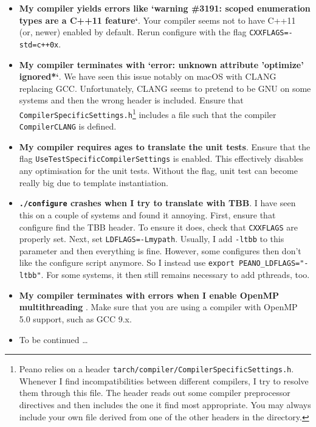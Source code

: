 \begin{itemize}
  \item \textbf{My compiler yields errors like `warning \#3191: scoped
  enumeration types are a C++11 feature`}. Your compiler seems not to have
  C++11 (or, newer) enabled by default. Rerun configure with the flag
  \texttt{CXXFLAGS=-std=c++0x}.
  \item \textbf{ My compiler terminates with `error: unknown
   attribute 'optimize' ignored*`}. We have seen this issue notably on macOS
   with CLANG replacing GCC. Unfortunately, CLANG seems to pretend to be GNU on
   some systems and then the wrong header is included. Ensure that
   \texttt{CompilerSpecificSettings.h}\footnote{Peano relies on a header \texttt{tarch/compiler/CompilerSpecificSettings.h}.
Whenever I find incompatibilities between different compilers, I try to resolve them through this file. 
The header reads out some compiler preprocessor directives and then includes the
one it find most appropriate. 
You may always include your own file derived from one of the other headers in
the directory.} includes a file such that the
   compiler
   \texttt{CompilerCLANG} is defined.
  \item \textbf{ My compiler requires ages to translate the unit tests}. Ensure
  that the flag \linebreak \texttt{UseTestSpecificCompilerSettings} is enabled.
  This effectively disables any optimisation for the unit tests. Without the
  flag, unit test can become really big due to template instantiation.
  \item \textbf{\texttt{./configure} crashes when I try to translate with TBB}.
  I have seen this on a couple of systems and found it annoying. 
  First, ensure that configure
  find the TBB header. To ensure it does, check that \texttt{CXXFLAGS} are properly
  set. Next, set \texttt{LDFLAGS=-Lmypath}. Usually, I add \texttt{-ltbb} to 
  this parameter and then everything is fine. However, some configures then don't 
  like the configure script anymore. So I instead use \texttt{export PEANO\_LDFLAGS="-ltbb"}. 
  For some systems, it then still remains necessary to add pthreads, too.
  \item \textbf{ My compiler terminates with errors when I enable OpenMP multithreading }.
  Make sure that you are using a compiler with OpenMP 5.0 support, such as GCC 9.x.
  \item To be continued \dots
\end{itemize}




